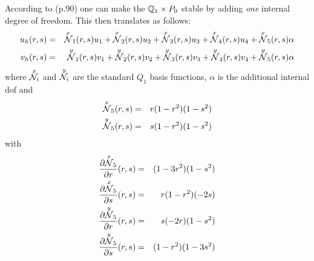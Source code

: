 According to \textcite{bobf08} (p.90) one can make the ${{\mathbb{Q}}}_1 \times P_0$ stable by adding {\it one}
internal degree of freedom. This then translates as follows:
\begin{eqnarray}
u_h(r,s) &=& 
\overset{\tiny x}{{\mathcal{N}}}_1(r,s) u_1 +
\overset{\tiny x}{{\mathcal{N}}}_2(r,s) u_2 +
\overset{\tiny x}{{\mathcal{N}}}_3(r,s) u_3 +
\overset{\tiny x}{{\mathcal{N}}}_4(r,s) u_4 + 
\overset{\tiny x}{{\mathcal{N}}}_5(r,s) \alpha \\
v_h(r,s) &=& 
\overset{\small y}{{\mathcal{N}}}_1(r,s) v_1 +
\overset{\small y}{{\mathcal{N}}}_2(r,s) v_2 +
\overset{\small y}{{\mathcal{N}}}_3(r,s) v_3 +
\overset{\small y}{{\mathcal{N}}}_4(r,s) v_4 + 
\overset{\small y}{{\mathcal{N}}}_5(r,s) \alpha 
\end{eqnarray}
where $\overset{\small x}{{\mathcal{N}}_i}$ and $\overset{\small y}{{\mathcal{N}}_i}$ 
are the standard $Q_1$ basis functions, $\alpha$ is the additional 
internal dof and 
\begin{eqnarray}
\overset{\small x}{{\mathcal{N}}}_5(r,s) &=& r(1-r^2)(1-s^2) \\
\overset{\small y}{{\mathcal{N}}}_5(r,s) &=& s(1-r^2)(1-s^2) 
\end{eqnarray}
with
\begin{eqnarray}
\frac{\partial \overset{\small x}{{\mathcal{N}}}_5}{\partial r}(r,s) &=& (1-3r^2)(1-s^2) \\
\frac{\partial \overset{\small x}{{\mathcal{N}}}_5}{\partial s}(r,s) &=& r(1-r^2)(-2s) \\
\frac{\partial \overset{\small y}{{\mathcal{N}}}_5}{\partial r}(r,s) &=& s(-2r)(1-s^2) \\
\frac{\partial \overset{\small y}{{\mathcal{N}}}_5}{\partial s}(r,s) &=& (1-r^2)(1-3s^2) 
\end{eqnarray}

